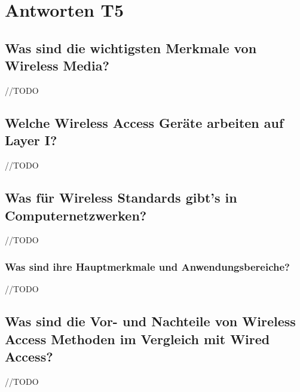 \section{Antworten T5}
\subsection*{Was sind die wichtigsten Merkmale von \flqq{}Wireless Media\frqq?}
//TODO
\subsection*{Welche Wireless Access Geräte arbeiten auf Layer I?}
//TODO
\subsection*{Was für Wireless Standards gibt’s in Computernetzwerken?}
//TODO
\subsubsection*{Was sind ihre Hauptmerkmale und Anwendungsbereiche?}
//TODO
\subsection*{Was sind die Vor- und Nachteile von \flqq{}Wireless Access\frqq{} Methoden im Vergleich mit \flqq{}Wired Access\frqq?}
//TODO